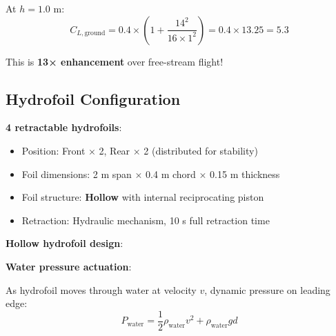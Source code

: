 \documentclass[12pt,a4paper]{article}
\begin{document}
At $h = 1.0$ m:
\begin{equation}
C_{L,\text{ground}} = 0.4 \times \left(1 + \frac{14^2}{16 \times 1^2}\right) = 0.4 \times 13.25 = 5.3
\end{equation}

This is \textbf{13× enhancement} over free-stream flight!

\subsection{Hydrofoil Configuration}

\textbf{4 retractable hydrofoils}:
\begin{itemize}
\item Position: Front × 2, Rear × 2 (distributed for stability)
\item Foil dimensions: 2 m span × 0.4 m chord × 0.15 m thickness
\item Foil structure: \textbf{Hollow} with internal reciprocating piston
\item Retraction: Hydraulic mechanism, 10 s full retraction time
\end{itemize}

\textbf{Hollow hydrofoil design}:
\begin{center}
\end{center}

\textbf{Water pressure actuation}:

As hydrofoil moves through water at velocity $v$, dynamic pressure on leading edge:
\begin{equation}
P_{\text{water}} = \frac{1}{2} \rho_{\text{water}} v^2 + \rho_{\text{water}} g d
\end{equation}
\end{document}
